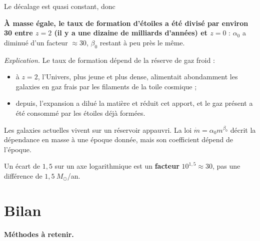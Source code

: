 \documentclass[11pt,a4paper]{article}
\providecommand{\tightlist}{\setlength{\itemsep}{0pt}\setlength{\parskip}{0pt}}
\newcommand{\equationajustee}[1]{%
  \sbox{\boiteequation}{$\displaystyle #1$}%
  \ifdim\wd\boiteequation>\linewidth
    \[\resizebox{\linewidth}{!}{\usebox{\boiteequation}}\]%
  \else
    \[#1\]%
  \fi}
\begin{document}
Le décalage est quasi constant, donc

\equationajustee{\frac{\dot m(z=2)}{\dot m(z=0)}\approx10^{1{,}5}\approx\underline{3\times10^1}}

\textbf{À masse égale, le taux de formation d'étoiles a été divisé par environ 30 entre \(z=2\) (il y a une dizaine de milliards d'années) et \(z=0\)} : \(\alpha_0\) a diminué d'un facteur \(\approx30\), \(\beta_0\) restant à peu près le même.

\emph{Explication.} Le taux de formation dépend de la réserve de gaz froid :

\begin{itemize}
\tightlist
\item
  à \(z=2\), l'Univers, plus jeune et plus dense, alimentait abondamment les galaxies en gaz frais par les filaments de la toile cosmique ;
\item
  depuis, l'expansion a dilué la matière et réduit cet apport, et le gaz présent a été consommé par les étoiles déjà formées.
\end{itemize}

Les galaxies actuelles vivent sur un réservoir appauvri. La loi \(\dot m=\alpha_0m^{\beta_0}\) décrit la dépendance en masse à une époque donnée, mais son coefficient dépend de l'époque.

\begin{piege}

Un écart de \(1{,}5\) sur un axe logarithmique est un \textbf{facteur} \(10^{1{,}5}\approx30\), pas une différence de \(1{,}5\ M_\odot\)/an.

\end{piege}

\hypertarget{bilan}{%
\section{Bilan}\label{bilan}}

\textbf{Méthodes à retenir.}
\end{document}
